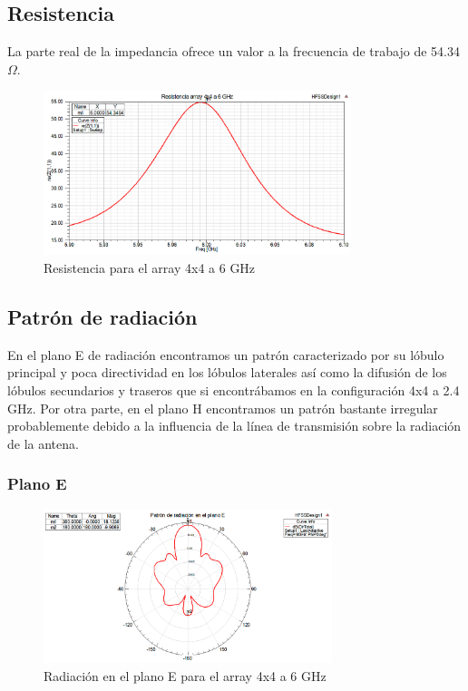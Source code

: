 \subsection{Resistencia}
\par La parte real de la impedancia ofrece un valor a la frecuencia de trabajo de 54.34 $\Omega$.
\\
\begin{figure}[H]
    \centering
        \includegraphics[width=0.8\textwidth]{archivos/analisis/4x42/3}
        \caption{Resistencia para el array 4x4 a 6 GHz}
        \label{fig:resis4x42}
\end{figure}

\subsection{Patrón de radiación}
\par En el plano E de radiación encontramos un patrón caracterizado por su lóbulo principal y poca directividad  en los lóbulos laterales así como la difusión de los lóbulos secundarios y traseros que si encontrábamos en la configuración 4x4 a 2.4 GHz. Por otra parte, en el plano H encontramos un patrón bastante irregular probablemente debido a la influencia de la línea de transmisión sobre la radiación de la antena.
\\
\subsubsection{Plano E}
\begin{figure}[H]
    \centering
        \includegraphics[width=0.75\textwidth]{archivos/analisis/4x42/4}
        \caption{Radiación en el plano E para el array 4x4 a 6 GHz}
        \label{fig:E4x42}
\end{figure}

